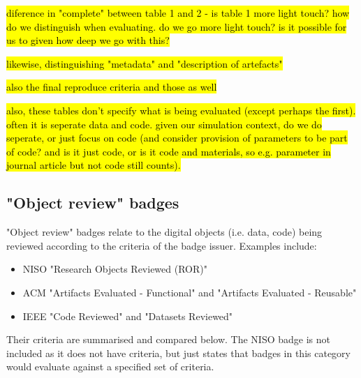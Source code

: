 \hl{diference in "complete" between table 1 and 2 - is table 1 more light touch? how do we distinguish when evaluating. do we go more light touch? is it possible for us to given how deep we go with this?}

\hl{likewise, distinguishing "metadata" and "description of artefacts"}

\hl{also the final reproduce criteria and those as well}

\hl{also, these tables don't specify what is being evaluated (except perhaps the first). often it is seperate data and code. given our simulation context, do we do seperate, or just focus on code (and consider provision of parameters to be part of code? and is it just code, or is it code and materials, so e.g. parameter in journal article but not code still counts).}

\subsection{"Object review" badges}

"Object review" badges relate to the digital objects (i.e. data, code) being reviewed according to the criteria of the badge issuer.\autocite{niso_reproducibility_badging_and_definitions_working_group_reproducibility_2021} Examples include:
\begin{itemize}
    \item NISO "Research Objects Reviewed (ROR)"\autocite{niso_reproducibility_badging_and_definitions_working_group_reproducibility_2021}
    \item ACM "Artifacts Evaluated - Functional" and "Artifacts Evaluated - Reusable"\autocite{association_for_computing_machinery_acm_artifact_2020}
    \item IEEE "Code Reviewed" and "Datasets Reviewed"\autocite{institute_of_electrical_and_electronics_engineers_ieee_about_nodate}
\end{itemize}

Their criteria are summarised and compared below. The NISO badge is not included as it does not have criteria, but just states that badges in this category would evaluate against a specified set of criteria.


